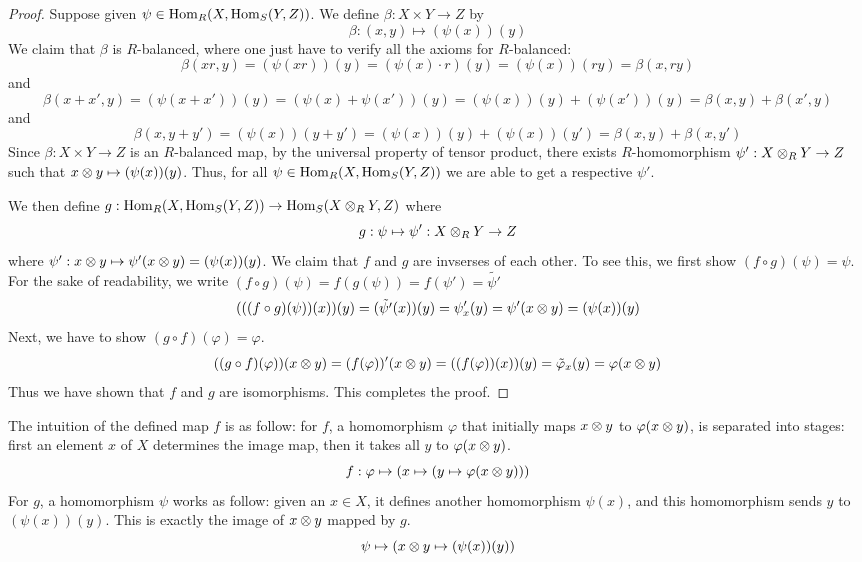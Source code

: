 \begin{proof}
    Suppose given $\psi\in \operatorname{Hom}_R(X, \operatorname{Hom}_S(Y,Z))$. We define $\beta: X\times Y \to Z$ by 
    \[\beta: (x,y)\mapsto (\psi(x))(y)\]
    We claim that $\beta$ is $R$-balanced, where one just have to verify all the axioms for $R$-balanced:
    \[\beta(xr,y) = (\psi(xr))(y) = (\psi(x)\cdot r)(y) = (\psi(x))(ry) = \beta(x,ry)\]
    and
    \[\beta(x+x',y) = (\psi(x+x'))(y) = (\psi(x) + \psi(x'))(y) = (\psi(x))(y) + (\psi(x'))(y) = \beta(x,y) + \beta(x',y)\]
    and 
    \[\beta(x,y+y') = (\psi(x))(y+y') = (\psi(x))(y) + (\psi(x))(y') = \beta(x,y) + \beta(x,y')\]
    Since $\beta:X\times Y\to Z$ is an $R$-balanced map, by the universal property of tensor product, there exists $R$-homomorphism $\psi':X\otimes_R Y\to Z$ such that $x\otimes y \mapsto (\psi(x))(y)$. Thus, for all $\psi\in \operatorname{Hom}_R(X, \operatorname{Hom}_S(Y,Z))$ we are able to get a respective $\psi'$.
    
    We then define $g:\operatorname{Hom}_R(X, \operatorname{Hom}_S(Y,Z))\to\operatorname{Hom}_S(X\otimes_R Y, Z)$ where 
    \[g: \psi \mapsto \psi' :X\otimes_R Y \to Z\]
    where $\psi':x\otimes y \mapsto \psi'(x\otimes y) = (\psi(x))(y)$. We claim that $f$ and $g$ are invserses of each other. To see this, we first show $(f\circ g)(\psi) = \psi$. For the sake of readability, we write $(f\circ g)(\psi) = f(g(\psi))= f(\psi') = \tilde{\psi'}$ 
    \[(((f\circ g)(\psi))(x))(y) = (\tilde{\psi'}(x))(y) = \psi'_x(y) = \psi' (x\otimes y) = (\psi(x))(y)\]
    Next, we have to show $(g\circ f)(\varphi) = \varphi$.
    \[((g\circ f)(\varphi))(x\otimes y) = (f(\varphi))'(x\otimes y) = ((f(\varphi))(x))(y) = \tilde\varphi_x(y) = \varphi(x\otimes y)\] 
    Thus we have shown that $f$ and $g$ are isomorphisms. This completes the proof.
\end{proof}

\begin{re}
    The intuition of the defined map $f$ is as follow: for $f$, a homomorphism $\varphi$ that initially maps $x\otimes y$ to $\varphi(x\otimes y)$, is separated into stages: first an element $x$ of $X$ determines the image map, then it takes all $y$ to $\varphi(x\otimes y)$.
    \[f:\varphi\mapsto (x\mapsto (y\mapsto \varphi(x\otimes y)))\]
    For $g$, a homomorphism $\psi$ works as follow: given an $x\in X$, it defines another homomorphism $\psi(x)$, and this homomorphism sends $y$ to $(\psi(x))(y)$. This is exactly the image of $x\otimes y$ mapped by $g$.
    \[\psi \mapsto (x\otimes y \mapsto (\psi(x))(y))\]
\end{re}

\medskip

